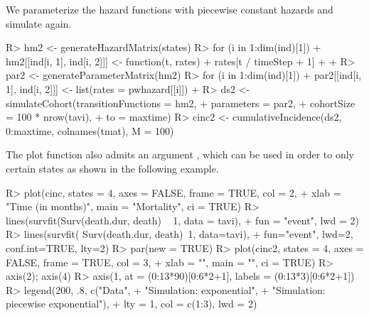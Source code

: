 We parameterize the hazard functions with piecewise constant hazards and simulate again.
\begin{Schunk}
\begin{Sinput}
R>   hm2 <- generateHazardMatrix(states)
R>   for (i in 1:dim(ind)[1]){
+     hm2[[ind[i, 1], ind[i, 2]]] <- function(t, rates) {
+       rates[t / timeStep + 1]
+     }
+   }
R>   par2 <- generateParameterMatrix(hm2)
R>   for (i in 1:dim(ind)[1]){
+     par2[[ind[i, 1], ind[i, 2]]] <- list(rates = pwhazard[[i]])
+   }
R>   ds2 <- simulateCohort(transitionFunctions = hm2, 
+                         parameters = par2, 
+                         cohortSize = 100 * nrow(tavi), 
+                         to = maxtime)
R>   cinc2 <- cumulativeIncidence(ds2, 0:maxtime, colnames(tmat), M = 100)
\end{Sinput}
\end{Schunk}

The plot function also admits an argument , which can be used in order to only  certain states as shown in the following example. 
\begin{Schunk}
\begin{Sinput}
R>   plot(cinc, states = 4, axes = FALSE, frame = TRUE, col = 2, 
+        xlab = "Time (in months)", main = "Mortality", ci = TRUE)
R>   lines(survfit(Surv(death.dur, death) ~ 1, data = tavi), 
+         fun = "event", lwd = 2)
R>   lines(survfit( Surv(death.dur, death)~1, data=tavi), 
+         fun="event", lwd=2, conf.int=TRUE, lty=2)
R>   par(new = TRUE)
R>   plot(cinc2, states = 4, axes = FALSE, frame = TRUE, col = 3, 
+        xlab = "", main = "", ci = TRUE)
R>   axis(2); axis(4)
R>   axis(1, at = (0:13*90)[0:6*2+1], labels = (0:13*3)[0:6*2+1])
R>   legend(200, .8, c("Data", 
+                     "Simulation: exponential", 
+                     "Simulation: piecewise exponential"), 
+          lty = 1, col = c(1:3), lwd = 2)
\end{Sinput}
\end{Schunk}

